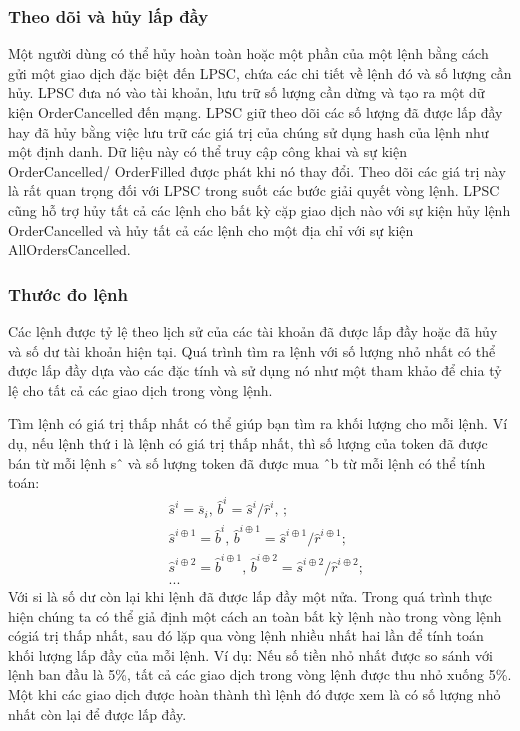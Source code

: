 \documentclass[12pt,a4paper]{article}
\begin{document}
\begin{multicols}{2}
\subsubsection{Theo dõi và hủy lấp đầy}
Một người dùng có thể hủy hoàn toàn hoặc một phần của một lệnh bằng cách gửi một giao dịch đặc biệt đến LPSC, chứa các chi tiết về lệnh đó và số lượng cần hủy. LPSC đưa nó vào tài khoản, lưu trữ số lượng cần dừng và tạo ra một dữ kiện OrderCancelled đến mạng. LPSC giữ theo dõi các số lượng đã được lấp đầy hay đã hủy bằng việc lưu trữ các giá trị của chúng sử dụng hash của lệnh như một định danh. Dữ liệu này có thể truy cập công khai và sự kiện OrderCancelled/ OrderFilled được phát khi nó thay đổi.  Theo dõi các giá trị này là rất quan trọng đối với LPSC trong suốt các bước giải quyết vòng lệnh.
  LPSC cũng hỗ trợ hủy tất cả các lệnh cho bất kỳ cặp giao dịch nào với sự kiện hủy lệnh OrderCancelled và hủy tất cả các lệnh cho một địa chỉ với sự kiện AllOrdersCancelled.

\subsubsection{Thước đo lệnh\label{sec:order_scaling}}
Các lệnh được tỷ lệ theo lịch sử của các tài khoản đã được lấp đầy hoặc đã hủy và số dư tài khoản hiện tại. Quá trình tìm ra lệnh với số lượng nhỏ nhất có thể được lấp đầy dựa vào các đặc tính và sử dụng nó như một tham khảo để chia tỷ lệ cho tất cả các giao dịch trong vòng lệnh.

Tìm lệnh có giá trị thấp nhất có thể giúp bạn tìm ra khối lượng cho mỗi lệnh. Ví dụ, nếu lệnh thứ i là lệnh có giá trị thấp nhất, thì số lượng của token đã được bán từ mỗi lệnh sˆ và số lượng token đã được mua ˆb  từ mỗi lệnh có thể tính toán:
\[
\begin{split}
&\hat{s}^{i}=\overline{s}_i\text{, } \hat{b}^{i}=\hat{s}^{i}/ \hat{r}^i\text{, }\text{;}\\
&\hat{s}^{i\oplus 1}=\hat{b}^i\text{, } \hat{b}^{i\oplus 1}=\hat{s}^{i\oplus 1}/ \hat{r}^{i\oplus 1}\text{;}\\
&\hat{s}^{i\oplus 2}=\hat{b}^{i\oplus 1}\text{, } \hat{b}^{i\oplus 2}=\hat{s}^{i\oplus 2}/ \hat{r}^{i\oplus 2}\text{;}\\
& ...
\end{split}
\]
Với     si   là số dư còn lại khi lệnh đã được lấp đầy một nửa.
Trong quá trình thực hiện chúng ta có thể giả định một cách an toàn bất kỳ lệnh nào trong vòng lệnh cógiá trị thấp nhất, sau đó lặp qua vòng lệnh nhiều nhất hai lần để tính toán khối lượng lấp đầy của mỗi lệnh.
Ví dụ: Nếu số tiền nhỏ nhất được so sánh với lệnh ban đầu là 5\%, tất cả các giao dịch trong vòng lệnh được thu nhỏ xuống 5\%. Một khi các giao dịch được hoàn thành thì lệnh đó được xem là có số lượng nhỏ nhất còn lại để được lấp đầy.


\end{multicols}
\end{document}
